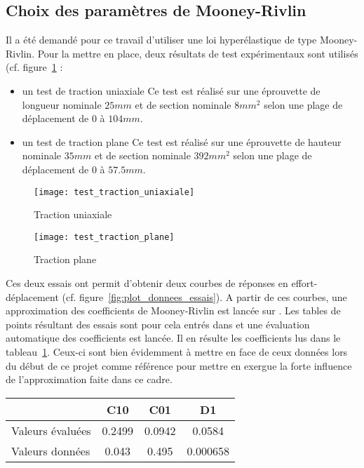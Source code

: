 ﻿\documentclass{article}
\newcommand{\abaqus}{\bsc{Abaqus}\xspace}
\begin{document}
\subsection{Choix des paramètres de Mooney-Rivlin}

Il a été demandé pour ce travail d'utiliser une loi hyperélastique de type Mooney-Rivlin. Pour la mettre en place, deux résultats de test expérimentaux sont utilisés (cf. figure~\ref{fig:essais_exp} : 
\begin{itemize}
\item un test de traction uniaxiale
Ce test est réalisé sur une éprouvette de longueur nominale $25 mm$ et de section nominale $8 mm^2$ selon une plage de déplacement de $0$ à $104 mm$.
\item un test de traction plane
Ce test est réalisé sur une éprouvette de hauteur nominale $35 mm$ et de section nominale $392 mm^2$ selon une plage de déplacement de $0$ à $57.5 mm$.
\end{itemize}

\begin{figure}
\centering
\texttt{[image: test\_traction\_uniaxiale]}
\caption{Traction uniaxiale}
\texttt{[image: test\_traction\_plane]}
\caption{Traction plane}
\label{fig:essais_exp}
\end{figure}

Ces deux essais ont permit d'obtenir deux courbes de réponses en effort-déplacement (cf. figure~\ref{fig:plot_donnees_essais}). A partir de ces courbes, une approximation des coefficients de Mooney-Rivlin est lancée sur \abaqus. Les tables de points résultant des essais sont pour cela entrés dans \abaqus et une évaluation automatique des coefficients est lancée. Il en résulte les coefficients lus dans le tableau~\ref{tab:donnees_MR}. Ceux-ci sont bien évidemment à mettre en face de ceux données lors du début de ce projet comme référence pour mettre en exergue la forte influence de l'approximation faite dans ce cadre.

\begin{table}
\centering
\begin{tabular}{|l|c|c|c|}
\hline
 & C10 & C01 & D1 \\ \hline
Valeurs évaluées & 0.2499 & 0.0942 & 0.0584 \\ \hline
Valeurs données & 0.043  & 0.495 & 0.000658 \\ \hline
\end{tabular} 
\label{tab:donnees_MR}
\end{table}
\end{document}
